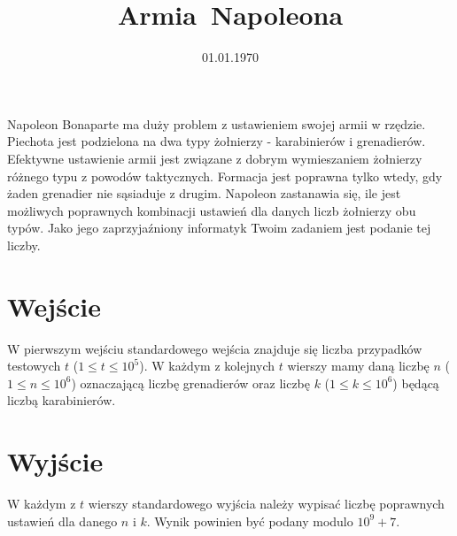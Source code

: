 \documentclass[zad]{soigstyl}
\date{01.01.1970}
\title{\mbox{Armia Napoleona}}
\begin{document}
\begin{tasktext}%
    \noindent
    Napoleon Bonaparte ma duży problem z ustawieniem swojej armii w rzędzie.
    Piechota jest podzielona na dwa typy żołnierzy - karabinierów i grenadierów.
    Efektywne ustawienie armii jest związane z dobrym wymieszaniem żołnierzy różnego typu z powodów taktycznych.
    Formacja jest poprawna tylko wtedy, gdy żaden grenadier nie sąsiaduje z drugim.
    Napoleon zastanawia się, ile jest możliwych poprawnych kombinacji ustawień dla danych liczb żołnierzy obu typów.
    Jako jego zaprzyjaźniony informatyk Twoim zadaniem jest podanie tej liczby.
	
    \section{Wejście}
	W pierwszym wejściu standardowego wejścia znajduje się liczba przypadków testowych $t$ ($1 \leqslant t \leqslant 10^{5}$).
	W każdym z kolejnych $t$ wierszy mamy daną liczbę $n$ ($1 \leqslant n \leqslant 10^6$) oznaczającą liczbę grenadierów oraz liczbę $k$ ($1 \leqslant k \leqslant 10^6$) będącą liczbą karabinierów.

	\section{Wyjście}
	W każdym z $t$ wierszy standardowego wyjścia należy wypisać liczbę poprawnych ustawień dla danego $n$ i $k$.
	Wynik powinien być podany modulo $10^9+7$.
	
	\oigprzyklady
\end{tasktext}
\end{document}
